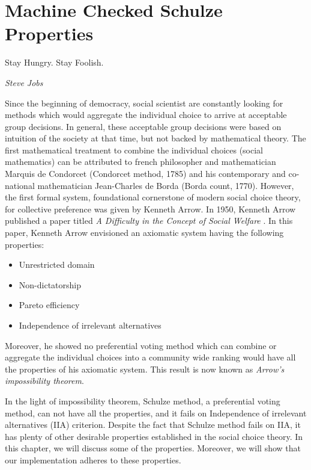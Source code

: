\chapter{Machine Checked Schulze Properties}
\label{cha:machine_checked}

\epigraph{Stay Hungry. Stay Foolish.} 
{\textit{Steve Jobs}} 


 Since the beginning of democracy, social scientist are constantly looking for methods  which would 
 aggregate the individual choice  to arrive at acceptable group decisions. 
 In general, these acceptable group decisions were based on intuition of the society at that time,
 but not backed by mathematical theory. The first mathematical 
 treatment to combine the individual choices (social mathematics)  can be 
 attributed to french philosopher and mathematician Marquis de Condorcet (Condorcet method, 1785) and his contemporary
 and co-national mathematician Jean-Charles de Borda (Borda count, 1770). However, the first formal system, foundational cornerstone
 of modern social choice theory, for collective preference was given by Kenneth Arrow. In 1950, Kenneth Arrow 
 published a paper titled \textit{A Difficulty in the Concept of Social Welfare} \citep{arrow1950difficulty}. 
 In this paper, Kenneth Arrow envisioned an axiomatic system having the following properties:
 
 \begin{itemize}
 \item Unrestricted domain
 \item Non-dictatorship
 \item Pareto efficiency
 \item Independence of irrelevant alternatives
 \end{itemize}
 
 Moreover, he showed no preferential voting method which can combine or aggregate the individual choices into a community wide 
 ranking would have all the properties of his axiomatic system. This result is now known as \textit{Arrow's impossibility theorem}. 


 In the light of impossibility theorem, Schulze method, a preferential voting method, can not have all the properties, and it fails on 
 Independence of irrelevant alternatives (IIA) criterion. Despite the fact that Schulze method fails on IIA,  it has plenty of other desirable
 properties established in the social choice theory. In this chapter, we will discuss some of 
 the properties.  Moreover, we will show that our implementation adheres to these properties. 
 
